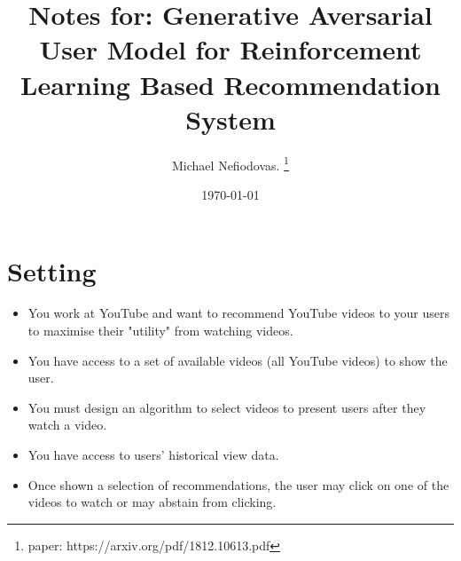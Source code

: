 \documentclass{article}
\title{Notes for: Generative Aversarial User Model for Reinforcement Learning Based Recommendation System}
\author{Michael Nefiodovas. \thanks{paper: https://arxiv.org/pdf/1812.10613.pdf}}
\date{\today}
\begin{document}
    \maketitle

    \section{Setting}
    \begin{itemize}
        \item You work at YouTube and want to recommend YouTube videos to your users to maximise their "utility" from watching videos.
        \item You have access to a set of available videos (all YouTube videos) to show the user.
        \item You must design an algorithm to select videos to present users after they watch a video.
        \item You have access to users' historical view data.
        \item Once shown a selection of recommendations, the user may click on one of the videos to watch or may abstain from clicking.
    \end{itemize}
    
\end{document}
